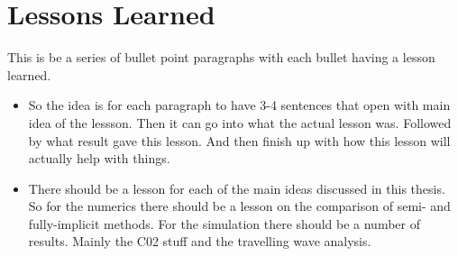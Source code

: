\section{Lessons Learned}
This is be a series of bullet point paragraphs with each bullet having a lesson learned.

\begin{itemize}
  \item So the idea is for each paragraph to have 3-4 sentences that open with main idea of the lessson. Then it can go into what the actual lesson was. Followed by what result gave this lesson. And then finish up with how this lesson will actually help with things.
  \item There should be a lesson for each of the main ideas discussed in this thesis. So for the numerics there should be a lesson on the comparison of semi- and fully-implicit methods. For the simulation there should be a number of results. Mainly the C02 stuff and the travelling wave analysis.
\end{itemize}
